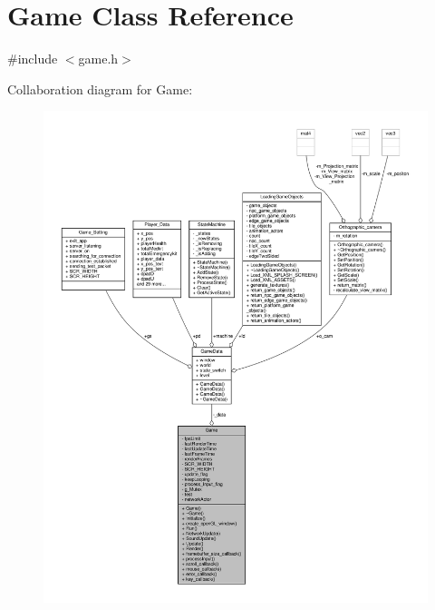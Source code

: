 \hypertarget{classGame}{}\section{Game Class Reference}
\label{classGame}


{\ttfamily \#include $<$game.\+h$>$}



Collaboration diagram for Game\+:
\nopagebreak
\begin{figure}[H]
\begin{center}
\leavevmode
\includegraphics[width=350pt]{classGame__coll__graph}
\end{center}
\end{figure}
